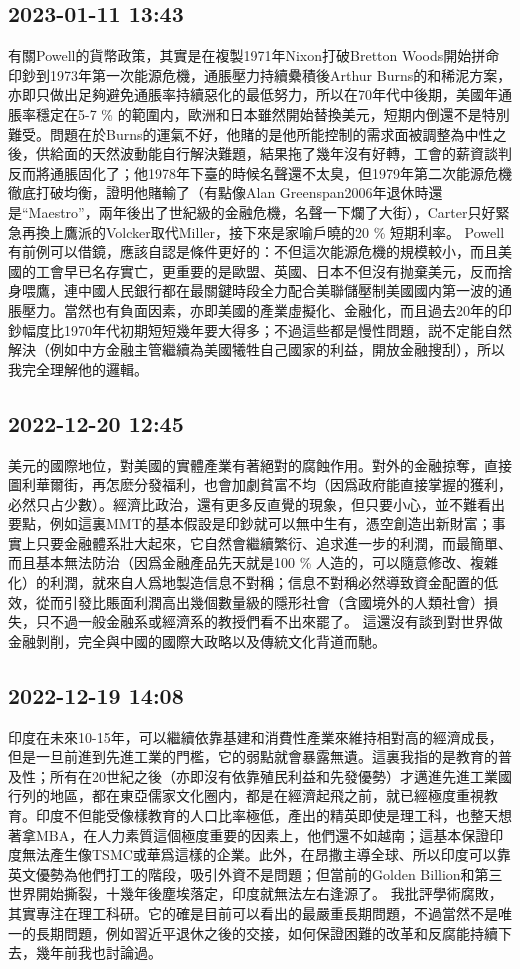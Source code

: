 \documentclass[twocolumn]{ctexart}
\begin{document}
\subsection*{2023-01-11 13:43}

有關Powell的貨幣政策，其實是在複製1971年Nixon打破Bretton Woods開始拼命印鈔到1973年第一次能源危機，通脹壓力持續纍積後Arthur Burns的和稀泥方案，亦即只做出足夠避免通脹率持續惡化的最低努力，所以在70年代中後期，美國年通脹率穩定在5-7 \% 的範圍内，歐洲和日本雖然開始替換美元，短期内倒還不是特別難受。問題在於Burns的運氣不好，他賭的是他所能控制的需求面被調整為中性之後，供給面的天然波動能自行解決難題，結果拖了幾年沒有好轉，工會的薪資談判反而將通脹固化了；他1978年下臺的時候名聲還不太臭，但1979年第二次能源危機徹底打破均衡，證明他賭輸了（有點像Alan Greenspan2006年退休時還是“Maestro”，兩年後出了世紀級的金融危機，名聲一下爛了大街），Carter只好緊急再換上鷹派的Volcker取代Miller，接下來是家喻戶曉的20 \% 短期利率。
Powell有前例可以借鏡，應該自認是條件更好的：不但這次能源危機的規模較小，而且美國的工會早已名存實亡，更重要的是歐盟、英國、日本不但沒有抛棄美元，反而捨身喂鷹，連中國人民銀行都在最關鍵時段全力配合美聯儲壓制美國國内第一波的通脹壓力。當然也有負面因素，亦即美國的產業虛擬化、金融化，而且過去20年的印鈔幅度比1970年代初期短短幾年要大得多；不過這些都是慢性問題，説不定能自然解決（例如中方金融主管繼續為美國犧牲自己國家的利益，開放金融搜刮），所以我完全理解他的邏輯。
\subsection*{2022-12-20 12:45}

美元的國際地位，對美國的實體產業有著絕對的腐蝕作用。對外的金融掠奪，直接圖利華爾街，再怎麽分發福利，也會加劇貧富不均（因爲政府能直接掌握的獲利，必然只占少數）。經濟比政治，還有更多反直覺的現象，但只要小心，並不難看出要點，例如這裏MMT的基本假設是印鈔就可以無中生有，憑空創造出新財富；事實上只要金融體系壯大起來，它自然會繼續繁衍、追求進一步的利潤，而最簡單、而且基本無法防治（因爲金融產品先天就是100 \% 人造的，可以隨意修改、複雜化）的利潤，就來自人爲地製造信息不對稱；信息不對稱必然導致資金配置的低效，從而引發比賬面利潤高出幾個數量級的隱形社會（含國境外的人類社會）損失，只不過一般金融系或經濟系的教授們看不出來罷了。
這還沒有談到對世界做金融剝削，完全與中國的國際大政略以及傳統文化背道而馳。
\subsection*{2022-12-19 14:08}

印度在未來10-15年，可以繼續依靠基建和消費性產業來維持相對高的經濟成長，但是一旦前進到先進工業的門檻，它的弱點就會暴露無遺。這裏我指的是教育的普及性；所有在20世紀之後（亦即沒有依靠殖民利益和先發優勢）才邁進先進工業國行列的地區，都在東亞儒家文化圈内，都是在經濟起飛之前，就已經極度重視教育。印度不但能受像樣教育的人口比率極低，產出的精英即使是理工科，也整天想著拿MBA，在人力素質這個極度重要的因素上，他們還不如越南；這基本保證印度無法產生像TSMC或華爲這樣的企業。此外，在昂撒主導全球、所以印度可以靠英文優勢為他們打工的階段，吸引外資不是問題；但當前的Golden Billion和第三世界開始撕裂，十幾年後塵埃落定，印度就無法左右逢源了。
我批評學術腐敗，其實專注在理工科研。它的確是目前可以看出的最嚴重長期問題，不過當然不是唯一的長期問題，例如習近平退休之後的交接，如何保證困難的改革和反腐能持續下去，幾年前我也討論過。
\end{document}

